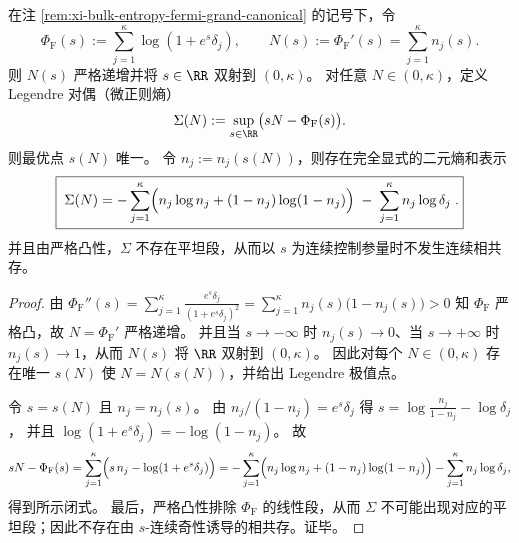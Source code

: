 \begin{proposition}\label{prop:xi-bulk-entropy-microcanonical-legendre-dual}
在注 \ref{rem:xi-bulk-entropy-fermi-grand-canonical} 的记号下，令
\[
\Phi_{\mathrm{F}}(s):=\sum_{j=1}^{\kappa}\log(1+e^s\delta_j),
\qquad
N(s):=\Phi_{\mathrm{F}}'(s)=\sum_{j=1}^{\kappa}n_j(s).
\]
则 \(N(s)\) 严格递增并将 \(s\in\RR\) 双射到 \((0,\kappa)\)。
对任意 \(N\in(0,\kappa)\)，定义 Legendre 对偶（微正则熵）
\[
\Sigma(N):=\sup_{s\in\RR}\bigl(sN-\Phi_{\mathrm{F}}(s)\bigr).
\]
则最优点 \(s(N)\) 唯一。
令 \(n_j:=n_j(s(N))\)，则存在完全显式的二元熵和表示
\[
\boxed{\;
\Sigma(N)= -\sum_{j=1}^{\kappa}\Bigl(n_j\log n_j+(1-n_j)\log(1-n_j)\Bigr)\;-\;\sum_{j=1}^{\kappa}n_j\log\delta_j\;.}
\]
并且由严格凸性，\(\Sigma\) 不存在平坦段，从而以 \(s\) 为连续控制参量时不发生连续相共存。
\end{proposition}
\begin{proof}
由
\(
\Phi_{\mathrm{F}}''(s)=\sum_{j=1}^{\kappa}\frac{e^s\delta_j}{(1+e^s\delta_j)^2}
=\sum_{j=1}^{\kappa}n_j(s)\bigl(1-n_j(s)\bigr)>0
\)
知 \(\Phi_{\mathrm{F}}\) 严格凸，故 \(N=\Phi_{\mathrm{F}}'\) 严格递增。
并且当 \(s\to-\infty\) 时 \(n_j(s)\to 0\)、当 \(s\to+\infty\) 时 \(n_j(s)\to 1\)，从而 \(N(s)\) 将 \(\RR\) 双射到 \((0,\kappa)\)。
因此对每个 \(N\in(0,\kappa)\) 存在唯一 \(s(N)\) 使 \(N=N(s(N))\)，并给出 Legendre 极值点。
\par
令 \(s=s(N)\) 且 \(n_j=n_j(s)\)。
由 \(n_j/(1-n_j)=e^s\delta_j\) 得
\(
s=\log\frac{n_j}{1-n_j}-\log\delta_j
\)，
并且
\(
\log(1+e^s\delta_j)=-\log(1-n_j)
\)。
故
\[
sN-\Phi_{\mathrm{F}}(s)
=\sum_{j=1}^{\kappa}\Bigl(s\,n_j-\log(1+e^s\delta_j)\Bigr)
=-\sum_{j=1}^{\kappa}\Bigl(n_j\log n_j+(1-n_j)\log(1-n_j)\Bigr)-\sum_{j=1}^{\kappa}n_j\log\delta_j,
\]
得到所示闭式。
最后，严格凸性排除 \(\Phi_{\mathrm{F}}\) 的线性段，从而 \(\Sigma\) 不可能出现对应的平坦段；因此不存在由 \(s\)-连续奇性诱导的相共存。证毕。
\end{proof}





